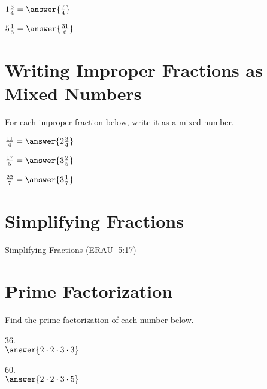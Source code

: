 \documentclass{ximera}
\begin{document}
\begin{problem}
$1\frac{3}{4} = \answer{\frac{7}{4}}$
\end{problem}

\begin{problem}
$5\frac{1}{6} = \answer{\frac{31}{6}}$
\end{problem}



\section*{Writing Improper Fractions as Mixed Numbers}

For each improper fraction below, write it as a mixed number.

\begin{problem}
$\frac{11}{4} = \answer{2\frac{3}{4}}$
\end{problem}

\begin{problem}
$\frac{17}{5} = \answer{3\frac{2}{5}}$
\end{problem}

\begin{problem}
$\frac{22}{7} = \answer{3\frac{1}{7}}$
\end{problem}


\section*{Simplifying Fractions}

Simplifying Fractions (ERAU| 5:17)



\section*{Prime Factorization}

Find the prime factorization of each number below.

\begin{problem}
$36$.\\
$\answer{2 \cdot 2 \cdot 3 \cdot 3}$
\end{problem}

\begin{problem}
$60$.\\
$\answer{2 \cdot 2 \cdot 3 \cdot 5}$
\end{problem}
\end{document}
